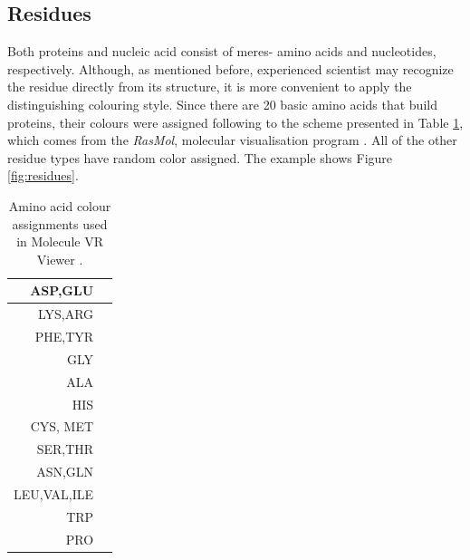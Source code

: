 \subsection{Residues}

Both proteins and nucleic acid consist of meres- amino acids and nucleotides, respectively. Although, as mentioned before, experienced scientist may recognize the residue directly from its structure, it is more convenient to apply the distinguishing colouring style. Since there are 20 basic amino acids that build proteins, their colours were assigned following to the scheme presented in Table \ref{tab:residues}, which comes from the \textit{RasMol}, molecular visualisation program \cite{Rasmol16}. All of the other residue types have random color assigned. The example shows Figure \ref{fig:residues}.

\begin{table}[h]
\centering 
\begin{tabular}{|r|c|}
  \hline 
  ASP,GLU & \cellcolor[RGB]{230,10,10} \\
  \hline
   LYS,ARG & \cellcolor[RGB]{20,90,255} \\
  \hline
  PHE,TYR & \cellcolor[RGB]{50,50,170} \\
  \hline
  GLY & \cellcolor[RGB]{235,235,235} \\
  \hline
  ALA & \cellcolor[RGB]{200,200,200} \\
  \hline  
  HIS & \cellcolor[RGB]{130,130,210} \\
  \hline
  CYS, MET & \cellcolor[RGB]{230,230,0} \\
  \hline
  SER,THR & \cellcolor[RGB]{250,150,0} \\
  \hline
  ASN,GLN & \cellcolor[RGB]{0,220,220} \\
  \hline
  LEU,VAL,ILE & \cellcolor[RGB]{15,130,15} \\
  \hline
  TRP & \cellcolor[RGB]{180,90,180} \\
  \hline
  PRO & \cellcolor[RGB]{220,150,130} \\
   \hline
\end{tabular}

\caption{Amino acid colour assignments used in Molecule VR Viewer \cite{Rasmol16}.}
\label{tab:residues}
\end{table}

